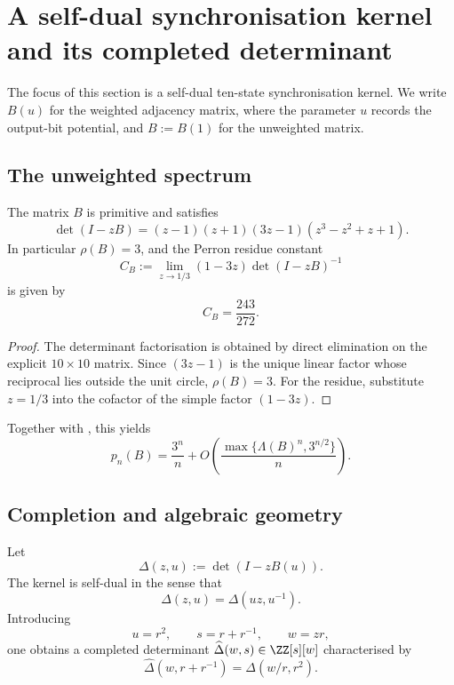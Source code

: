 \section{A self-dual synchronisation kernel and its completed determinant}
\label{sec:online-kernel}

The focus of this section is a self-dual ten-state synchronisation kernel. We
write $B(u)$ for the weighted adjacency matrix, where the parameter
$u$ records the output-bit potential, and $B:=B(1)$ for the unweighted
matrix.

\subsection{The unweighted spectrum}

\begin{proposition}
  \label{prop:sync-kernel-spectrum}
  The matrix $B$ is primitive and satisfies
  \[
    \det(I-zB)=(z-1)(z+1)(3z-1)(z^3-z^2+z+1).
  \]
  In particular $\rho(B)=3$, and the Perron residue constant
  \[
    C_B:=\lim_{z\to 1/3}(1-3z)\det(I-zB)^{-1}
  \]
  is given by
  \[
    C_B=\frac{243}{272}.
  \]
\end{proposition}

\begin{proof}
  The determinant factorisation is obtained by direct elimination on
  the explicit $10\times 10$ matrix. Since $(3z-1)$ is the unique
  linear factor whose reciprocal lies outside the unit circle,
  $\rho(B)=3$. For the residue, substitute $z=1/3$ into the cofactor of
  the simple factor $(1-3z)$.
\end{proof}

Together with , this yields
\[
  p_n(B)=\frac{3^n}{n}+O\!\left(\frac{\max\{\Lambda(B)^n,3^{n/2}\}}{n}\right).
\]

\subsection{Completion and algebraic geometry}

Let
\[
  \Delta(z,u):=\det(I-zB(u)).
\]
The kernel is self-dual in the sense that
\[
  \Delta(z,u)=\Delta(uz,u^{-1}).
\]
Introducing
\[
  u=r^2,\qquad s=r+r^{-1},\qquad w=zr,
\]
one obtains a completed determinant
$\widehat\Delta(w,s)\in\ZZ[s][w]$ characterised by
\[
  \widehat\Delta(w,r+r^{-1})=\Delta(w/r,r^2).
\]

